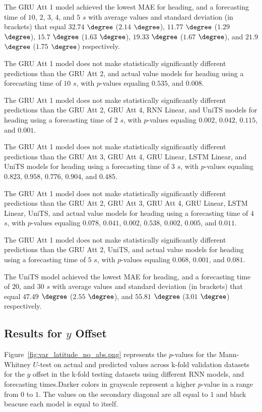 The GRU Att 1 model achieved the lowest MAE for heading, and a forecasting time of $10$, $2$, $3$, $4$, and $5$ $s$ with average values and standard deviation (in brackets) that equal $32.74$ $\degree$ ($2.14$ $\degree$), $11.77$ $\degree$ ($1.29$ $\degree$), $15.7$ $\degree$ ($1.63$ $\degree$), $19.33$ $\degree$ ($1.67$ $\degree$), and $21.9$ $\degree$ ($1.75$ $\degree$) respectively.

The GRU Att 1 model does not make statistically significantly different predictions than the GRU Att 2, and actual value models for heading using a forecasting time of $10$ $s$, with $p$-values equaling $0.535$, and $0.008$.

The GRU Att 1 model does not make statistically significantly different predictions than the GRU Att 2, GRU Att 4, RNN Linear, and UniTS models for heading using a forecasting time of $2$ $s$, with $p$-values equaling $0.002$, $0.042$, $0.115$, and $0.001$.

The GRU Att 1 model does not make statistically significantly different predictions than the GRU Att 3, GRU Att 4, GRU Linear, LSTM Linear, and UniTS models for heading using a forecasting time of $3$ $s$, with $p$-values equaling $0.823$, $0.958$, $0.776$, $0.904$, and $0.485$.

The GRU Att 1 model does not make statistically significantly different predictions than the GRU Att 2, GRU Att 3, GRU Att 4, GRU Linear, LSTM Linear, UniTS, and actual value models for heading using a forecasting time of $4$ $s$, with $p$-values equaling $0.078$, $0.041$, $0.002$, $0.538$, $0.002$, $0.005$, and $0.011$.

The GRU Att 1 model does not make statistically significantly different predictions than the GRU Att 2, UniTS, and actual value models for heading using a forecasting time of $5$ $s$, with $p$-values equaling $0.068$, $0.001$, and $0.081$.

The UniTS model achieved the lowest MAE for heading, and a forecasting time of $20$, and $30$ $s$ with average values and standard deviation (in brackets) that equal $47.49$ $\degree$ ($2.55$ $\degree$), and $55.81$ $\degree$ ($3.01$ $\degree$) respectively.

\subsection{Results for $y$ Offset}

Figure~\ref{fig:var_latitude_no_abs.png} represents the $p$-values for the Mann-Whitney $U$-test on actual and predicted values across k-fold validation datasets for the $y$ offset in the k-fold testing datasets using different RNN models, and forecasting times.Darker colors in grayscale represent a higher $p$-value in a range from $0$ to $1$. The values on the secondary diagonal are all equal to $1$ and black beacuse each model is equal to itself.

